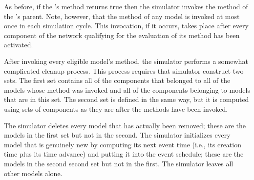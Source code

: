 As before, if the 's  method returns true then the simulator invokes the  method of the 's parent. Note, however, that the  method of any model is invoked at most once in each simulation cycle. This invocation, if it occurs, takes place after every component of the network qualifying for the evaluation of its  method has been activated.

After invoking every eligible model's  method, the simulator performs a somewhat complicated cleanup process. This process requires that simulator construct two sets. The first set contains all of the components that belonged to all of the  models whose  method was invoked and all of the components belonging to models that are in this set. The second set is defined in the same way, but it is computed using sets of components as they are after the  methods have been invoked.

The simulator deletes every model that has actually been removed; these are the models in the first set but not in the second. The simulator initializes every model that is genuinely new by computing its next event time (i.e., its creation time plus its time advance) and putting it into the event schedule; these are the models in the second second set but not in the first. The simulator leaves all other models alone.

